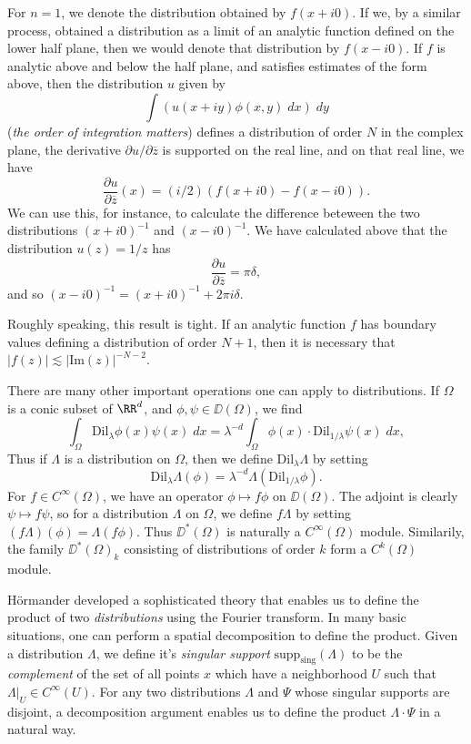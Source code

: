 \begin{example}
    For $n = 1$, we denote the distribution obtained by $f(x + i 0)$. If we, by a similar process, obtained a distribution as a limit of an analytic function defined on the lower half plane, then we would denote that distribution by $f(x - i0)$. If $f$ is analytic above and below the half plane, and satisfies estimates of the form above, then the distribution $u$ given by
    \[ \int \left( u(x + i y) \phi(x,y)\; dx \right)\; dy \]
    (\emph{the order of integration matters}) defines a distribution of order $N$ in the complex plane, the derivative $\partial u / \partial \overline{z}$ is supported on the real line, and on that real line, we have
    \[ \frac{\partial u}{\partial \overline{z}}(x) = (i/2) \left( f(x + i0) - f(x - i0) \right). \]
    We can use this, for instance, to calculate the difference beteween the two distributions $(x + i0)^{-1}$ and $(x - i0)^{-1}$. We have calculated above that the distribution $u(z) = 1/z$ has
    \[ \frac{\partial u}{\partial \overline{z}} = \pi \delta, \]
    and so $(x - i0)^{-1} = (x + i0)^{-1} + 2 \pi i \delta$.
\end{example}

\begin{remark}
    Roughly speaking, this result is tight. If an analytic function $f$ has boundary values defining a distribution of order $N+1$, then it is necessary that $|f(z)| \lesssim |\text{Im}(z)|^{-N-2}$.
\end{remark}

There are many other important operations one can apply to distributions. If $\Omega$ is a conic subset of $\RR^d$, and $\phi,\psi \in \DD(\Omega)$, we find
%
\[ \int_{\Omega} \text{Dil}_\lambda \phi(x) \psi(x)\; dx = \lambda^{-d} \int_{\Omega} \phi(x) \cdot \text{Dil}_{1/\lambda} \psi(x)\; dx, \]
%
Thus if $\Lambda$ is a distribution on $\Omega$, then we define $\text{Dil}_\lambda \Lambda$ by setting
%
\[ \text{Dil}_\lambda \Lambda (\phi) = \lambda^{-d} \Lambda( \text{Dil}_{1/\lambda} \phi). \]
%
For $f \in C^\infty(\Omega)$, we have an operator $\phi \mapsto f \phi$ on $\DD(\Omega)$. The adjoint is clearly $\psi \mapsto f \psi$, so for a distribution $\Lambda$ on $\Omega$, we define $f \Lambda$ by setting $(f\Lambda)(\phi) = \Lambda(f \phi)$. Thus $\DD^*(\Omega)$ is naturally a $C^\infty(\Omega)$ module. Similarily, the family $\DD^*(\Omega)_k$ consisting of distributions of order $k$ form a $C^k(\Omega)$ module.

\begin{remark}
    H\"{o}rmander developed a sophisticated theory that enables us to define the product of two \emph{distributions} using the Fourier transform. In many basic situations, one can perform a spatial decomposition to define the product. Given a distribution $\Lambda$, we define it's \emph{singular support} $\text{supp}_{\text{sing}}(\Lambda)$ to be the \emph{complement} of the set of all points $x$ which have a neighborhood $U$ such that $\Lambda|_U \in C^\infty(U)$. For any two distributions $\Lambda$ and $\Psi$ whose singular supports are disjoint, a decomposition argument enables us to define the product $\Lambda \cdot \Psi$ in a natural way.
\end{remark}

